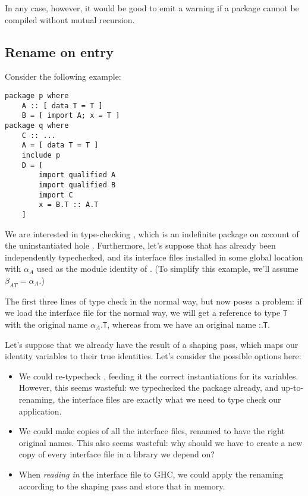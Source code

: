 \documentclass{article}
\begin{document}
In any case, however, it would be good to emit a warning if a package
cannot be compiled without mutual recursion.

\subsection{Rename on entry}

Consider the following example:

\begin{verbatim}
package p where
    A :: [ data T = T ]
    B = [ import A; x = T ]
package q where
    C :: ...
    A = [ data T = T ]
    include p
    D = [
        import qualified A
        import qualified B
        import C
        x = B.T :: A.T
    ]
\end{verbatim}

We are interested in type-checking , which is an indefinite package
on account of the uninstantiated hole .  Furthermore, let's suppose that
 has already been independently typechecked, and its interface files
installed in some global location with $\alpha_A$ used as the module identity
of . (To simplify this example, we'll assume $\beta_{AT}=\alpha_A$.)

The first three lines of  type check in the normal way, but 
now poses a problem: if we load the interface file for  the normal way,
we will get a reference to type \texttt{T} with the original name $\alpha_A$.\texttt{T},
whereas from  we have an original name :.\texttt{T}.

Let's suppose that we already have the result of a shaping pass, which
maps our identity variables to their true identities.
Let's consider the possible options here:

\begin{itemize}
    \item We could re-typecheck , feeding it the correct instantiations
        for its variables.  However, this seems wasteful: we typechecked the
        package already, and up-to-renaming, the interface files are exactly
        what we need to type check our application.
    \item We could make copies of all the interface files, renamed to have the
        right original names.  This also seems wasteful: why should we have to
        create a new copy of every interface file in a library we depend on?
    \item When \emph{reading in} the interface file to GHC, we could apply the
        renaming according to the shaping pass and store that in memory.
\end{itemize}
\end{document}

